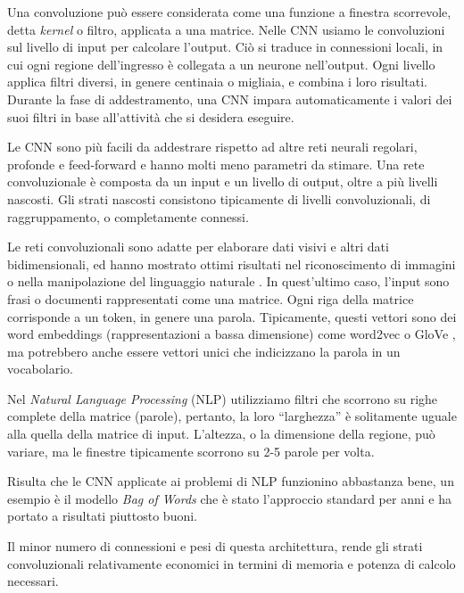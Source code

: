 Una convoluzione può essere considerata come una funzione a finestra scorrevole, detta \emph{kernel} o filtro, applicata a una matrice. 
Nelle CNN usiamo le convoluzioni sul livello di input per calcolare l'output. Ciò si traduce in connessioni locali, in cui ogni regione dell'ingresso è collegata a un neurone nell'output. Ogni livello applica filtri diversi, in genere centinaia o migliaia, e combina i loro risultati. 
Durante la fase di addestramento, una CNN impara automaticamente i valori dei suoi filtri in base all'attività che si desidera eseguire. 

Le CNN sono più facili da addestrare rispetto ad altre reti neurali regolari, profonde e feed-forward e hanno molti meno parametri da stimare. Una rete convoluzionale è composta da un input e un livello di output, oltre a più livelli nascosti. Gli strati nascosti consistono tipicamente di livelli convoluzionali, di raggruppamento, o completamente connessi.

Le reti convoluzionali sono adatte per elaborare dati visivi e altri dati bidimensionali, ed hanno mostrato ottimi risultati nel riconoscimento di immagini o nella manipolazione del linguaggio naturale \cite{manning1999foundations,FIXME}.
In quest'ultimo caso, l'input sono frasi o documenti rappresentati come una matrice. Ogni riga della matrice corrisponde a un token, in genere una parola. Tipicamente, questi vettori sono dei word embeddings (rappresentazioni a bassa dimensione) come word2vec \cite{mikolov2013distributed} o GloVe \cite{pennington2014glove}, ma potrebbero anche essere vettori unici che indicizzano la parola in un vocabolario. 

Nel \emph{Natural Language Processing} (NLP) utilizziamo filtri che scorrono su righe complete della matrice (parole), pertanto, la loro ``larghezza'' è solitamente uguale alla quella della matrice di input. L'altezza, o la dimensione della regione, può variare, ma le finestre tipicamente scorrono su 2-5 parole per volta. 

Risulta che le CNN applicate ai problemi di NLP funzionino abbastanza bene, un esempio è il modello \emph{Bag of Words} che è stato l'approccio standard per anni e ha portato a risultati piuttosto buoni.




Il minor numero di connessioni e pesi di questa architettura, rende gli strati convoluzionali relativamente economici in termini di memoria e potenza di calcolo necessari.
